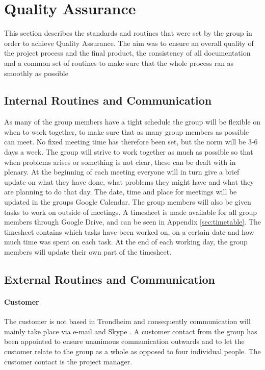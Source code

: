 \section{Quality Assurance}

This section describes the standards and routines that were set by the group in order to achieve Quality Assurance. The aim was to ensure an overall quality of the project process and the final product, the consistency of all documentation and a common set of routines to make sure that the whole process ran as smoothly as possible

\subsection{Internal Routines and Communication}

As many of the group members have a tight schedule the group will be flexible on when to work together, to make sure that as many group members as possible can meet. No fixed meeting time has therefore been set, but the norm will be 3-6 days a week. The group will strive to work together as much as possible so that when problems arises or something is not clear, these can be dealt with in plenary. At the beginning of each meeting everyone will in turn give a brief update on what they have done, what problems they might have and what they are planning to do that day. The date, time and place for meetings will be updated in the groups Google Calendar\cite{googleCalendar}. The group members will also be given tasks to work on outside of meetings. A timesheet is made available for all group members through Google Drive\cite{googleDrive}, and can be seen in Appendix \ref{sec:timetable}. The timesheet contains which tasks have been worked on, on a certain date and how much time was spent on each task. At the end of each working day, the group members will update their own part of the timesheet.

\subsection{External Routines and Communication}

\paragraph{Customer}

The customer is not based in Trondheim and consequently communication will mainly take place via e-mail and Skype
\cite{skype}. A customer contact from the group has been appointed to ensure unanimous communication outwards and to let the customer relate to the group as a whole as opposed to four individual people. The customer contact is the project manager. 

